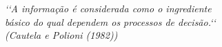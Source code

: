 \begin{epigrafe}
\vspace*{\fill}
\begin{flushright}
\textit{‘‘A informação é considerada como o ingrediente \\
básico do qual dependem os processos de decisão.‘‘\\
(Cautela e Polioni (1982))}
\end{flushright}
\end{epigrafe}
